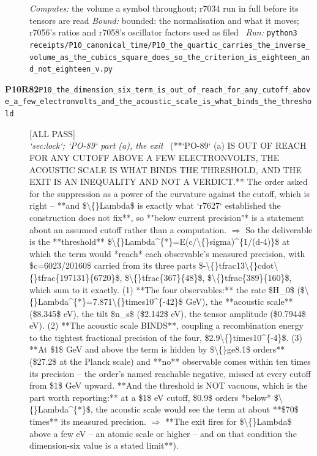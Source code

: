\begin{description}
\emph{Computes:} the volume a symbol throughout; r7034 run in full before its tensors are read
 \emph{Bound:} bounded: the normalisation and what it moves; r7056's ratios and r7058's oscillator factors used as filed
\ \emph{Run:} \texttt{python3 receipts/P10\_canonical\_time/P10\_the\_quartic\_carries\_the\_inverse\_volume\_as\_the\_cubics\_square\_does\_so\_the\_criterion\_is\_eighteen\_and\_not\_eighteen\_v.py}
\item[\rcptlabel{P10_the_dimension_six_term_is_out_of_reach_for_any_cutoff_above_a_few_electronvolts_and_the_acoustic_scale_is_what_binds_the_threshold}{P10R82}\textbf{P10R82}\quad\texttt{P10\_the\_dimension\_six\_term\_is\_out\_of\_reach\_for\_any\_cutoff\_above\_a\_few\_electronvolts\_and\_the\_acoustic\_scale\_is\_what\_binds\_the\_threshold}]\hfill\textsf{[ALL PASS]}\\
\textit{`sec:lock`; `PO-89` part (a), the exit} \ (**`PO-89` (a) IS OUT OF REACH FOR ANY CUTOFF ABOVE A FEW ELECTRONVOLTS, THE ACOUSTIC SCALE IS WHAT BINDS THE THRESHOLD, AND THE EXIT IS AN INEQUALITY AND NOT A VERDICT.** The order asked for the suppression as a power of the curvature against the cutoff, which is right --  **and \$\textbackslash\{\}Lambda\$ is exactly what `r7627` established the construction does not fix**, so *"below current precision"* is a statement about an assumed cutoff rather than a computation. \ensuremath{\Rightarrow} So the deliverable is the **threshold** \$\textbackslash\{\}Lambda\textasciicircum{}\{*\}=E(c/\textbackslash\{\}sigma)\textasciicircum{}\{1/(d-4)\}\$ at which the term would *reach* each observable's measured precision, with \$c=6023/20160\$ carried from its three parts \$-\textbackslash\{\}tfrac13\textbackslash\{\}cdot\textbackslash\{\}tfrac\{197131\}\{6720\}\$, \$\textbackslash\{\}tfrac\{367\}\{48\}\$, \$\textbackslash\{\}tfrac\{389\}\{160\}\$, which sum to it exactly. (1) **The four observables:** the rate \$H\_0\$ (\$\textbackslash\{\}Lambda\textasciicircum{}\{*\}=7.871\textbackslash\{\}times10\textasciicircum{}\{-42\}\$ GeV), the **acoustic scale** (\$8.345\$ eV), the tilt \$n\_s\$ (\$2.142\$ eV), the tensor amplitude (\$0.7944\$ eV). (2) **The acoustic scale BINDS**, coupling a recombination energy to the tightest fractional precision of the four, \$2.9\textbackslash\{\}times10\textasciicircum{}\{-4\}\$. (3) **At \$1\$ GeV and above the term is hidden by \$\textbackslash\{\}ge8.1\$ orders** (\$27.2\$ at the Planck scale) and **no** observable comes within ten times its precision -- the order's named reachable negative, missed at every cutoff from \$1\$ GeV upward.  **And the threshold is NOT vacuous, which is the part worth reporting:** at a \$1\$ eV cutoff, \$0.9\$ orders *below* \$\textbackslash\{\}Lambda\textasciicircum{}\{*\}\$, the acoustic scale would see the term at about **\$70\$ times** its measured precision. \ensuremath{\Rightarrow} **The exit fires for \$\textbackslash\{\}Lambda\$ above a few eV -- an atomic scale or higher -- and on that condition the dimension-six value is a stated limit**). 

\end{description}
